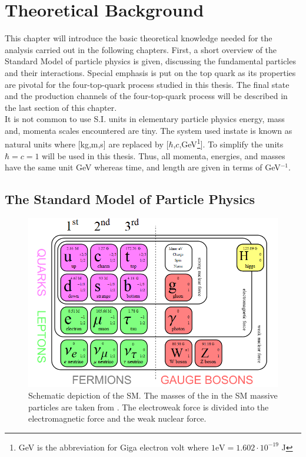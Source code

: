 \chapter{Theoretical Background}
\label{sec:theory}
This chapter will introduce the basic theoretical knowledge needed for the analysis carried out in the following chapters. First, a short overview of the Standard Model of particle physics is given, discussing the fundamental particles and their interactions. Special emphasis is put on the top quark as its properties are pivotal for the four-top-quark process studied in this thesis. The final state and the production channels of the four-top-quark process will be described in the last section of this chapter. \\
It is not common to use S.I. units in elementary particle physics energy, mass and, momenta scales encountered are tiny. The system used instate is known as natural units where [kg,m,s] are replaced by [$\hbar$,$c$,GeV\footnote{GeV is the abbreviation for Giga electron volt where $1\text{eV} = 1.602 \cdot 10^{-19}$ J}]. To simplify the units $\hbar = c = 1$ will be used in this thesis. Thus, all momenta, energies, and masses have the same unit GeV whereas time, and length are given in terms of GeV$^{-1}$.

\section{The Standard Model of Particle Physics}
\label{sec:SM}
\begin{figure}[H]
\centering
\includegraphics[scale=0.5]{figs/SM.png}
\caption{Schematic depiction of the SM. The masses of the in the SM massive particles are taken from \cite{PDG2020}. The electroweak force is divided into the electromagnetic force and the weak nuclear force. \cite{SMScheme}}
\label{fig:SM}
\end{figure}

